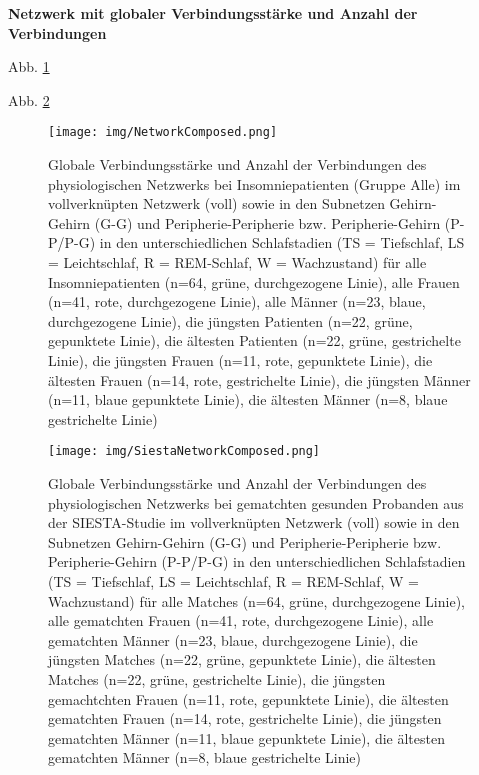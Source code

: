 \textbf{Netzwerk mit globaler Verbindungsstärke und Anzahl der Verbindungen}

Abb. \ref{fig:NetworkComposed}

Abb. \ref{fig:SiestaNetworkComposed}



\begin{figure}[H]
	\centering
	\texttt{[image: img/NetworkComposed.png]}
	\caption[Globale Verbindungsstärke und Anzahl der Verbindungen des physiologischen Netzwerks bei Insomniepatienten]{Globale Verbindungsstärke und Anzahl der Verbindungen des physiologischen Netzwerks bei Insomniepatienten (Gruppe Alle) im vollverknüpten Netzwerk (voll) sowie in den Subnetzen Gehirn-Gehirn (G-G) und Peripherie-Peripherie bzw. Peripherie-Gehirn (P-P/P-G) in den unterschiedlichen Schlafstadien (TS = Tiefschlaf, LS = Leichtschlaf, R = \acs{REM}-Schlaf, W = Wachzustand) für
alle Insomniepatienten (n=64, grüne, durchgezogene Linie), alle Frauen (n=41, rote, durchgezogene Linie), alle Männer (n=23, blaue, durchgezogene Linie), die jüngsten Patienten (n=22, grüne, gepunktete Linie), die ältesten Patienten (n=22, grüne, gestrichelte Linie), die jüngsten Frauen (n=11, rote, gepunktete Linie), die ältesten Frauen (n=14, rote, gestrichelte Linie), die jüngsten Männer (n=11, blaue gepunktete Linie), die ältesten Männer (n=8, blaue gestrichelte Linie)}
	\label{fig:NetworkComposed}
\end{figure}



\begin{figure}[H]
	\centering
	\texttt{[image: img/SiestaNetworkComposed.png]}
	\caption[Globale Verbindungsstärke und Anzahl der Verbindungen des physiologischen Netzwerks bei gematchten gesunden Probanden]{Globale Verbindungsstärke und Anzahl der Verbindungen des physiologischen Netzwerks bei gematchten gesunden Probanden aus der SIESTA-Studie im vollverknüpten Netzwerk (voll) sowie in den Subnetzen Gehirn-Gehirn (G-G) und Peripherie-Peripherie bzw. Peripherie-Gehirn (P-P/P-G) in den unterschiedlichen Schlafstadien (TS = Tiefschlaf, LS = Leichtschlaf, R = \acs{REM}-Schlaf, W = Wachzustand) für
alle Matches (n=64, grüne, durchgezogene Linie), alle gematchten Frauen (n=41, rote, durchgezogene Linie), alle gematchten Männer (n=23, blaue, durchgezogene Linie), die jüngsten Matches (n=22, grüne, gepunktete Linie), die ältesten Matches (n=22, grüne, gestrichelte Linie), die jüngsten gemachtchten Frauen (n=11, rote, gepunktete Linie), die ältesten gematchten Frauen (n=14, rote, gestrichelte Linie), die jüngsten gematchten Männer (n=11, blaue gepunktete Linie), die ältesten gematchten Männer (n=8, blaue gestrichelte Linie)}
	\label{fig:SiestaNetworkComposed}
\end{figure}


